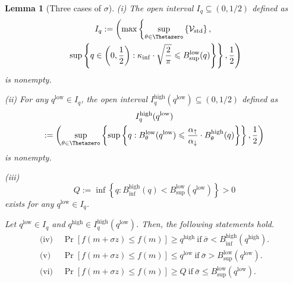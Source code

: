 \documentclass[journal]{IEEEtran}
\renewcommand{\geq}{\geqslant} %
\renewcommand{\leq}{\leqslant} %
\newtheorem{lemma}[theorem]{Lemma}
\theoremstyle{definition}
\newcommand{\aup}{\alpha_{\uparrow}}
\newcommand{\adown}{\alpha_{\downarrow}}
\begin{document}
\begin{lemma}[Three cases of $\sigma$]
(i) The open interval $I_q\subseteq (0, 1/2)$ defined as 
\begin{multline}
I_q := \left(
\max\left\{
\underset{\theta\in\Thetazero}{\sup}
\left\{\mathcal{V}_\mathrm{std}\right\}
,
\right.
\right.
\\
\left.
\left.
\sup\left\{
q\in\left(0, \frac12\right):
\kappa_{\inf}
\cdot
\sqrt{\frac{2}{\pi}} \leq 
B_{\sup}^\mathrm{low}(q) 
\right\}
\right\}
, \frac{1}{2} 
\right)
\label{eq:def_Iq}
\end{multline}
is nonempty.

(ii) For any $q^\mathrm{low}\in I_q$, the open interval $I_q^{\mathrm{high}}(q^\mathrm{low}) \subseteq (0, 1/2)$ defined as
\begin{multline}
I_q^{\mathrm{high}}(q^\mathrm{low})
\\
:=
\left(
\underset{\theta\in\Thetazero}{\sup}
\left\{
\sup
\left\{
q :
B_\theta^\mathrm{low}(q^\mathrm{low}) 
\leq \frac{\aup}{\adown}\cdot B_\theta^\mathrm{high}(q)
\right\}
\right\}, \frac12 \right)
\label{eq:def_qhigh}
\end{multline}
is nonempty.

(iii)
\begin{equation}
Q := 
\inf \left\{ q : 
B_{\inf}^\mathrm{high}(q)
< 
B_{\sup}^\mathrm{low}(q^\mathrm{low})
\right\}
>0
\label{eq:def_Q}
\end{equation}
exists
for any $q^\mathrm{low}\in I_q$.

Let $q^\mathrm{low} \in I_q$ and $q^\mathrm{high} \in I_q^\mathrm{high}(q^\mathrm{low})$. Then, the following statements hold.
%
\begin{align}
  \text{(iv) }
  &\Pr\left[f(m + \sigma z) \leq f(m) \right] \geq q^\mathrm{high} 
  \ \text{if}\ \bar\sigma < B_{\inf}^\mathrm{high}(q^\mathrm{high}). \label{eq:lemma:toosmall}  
  \\
  \text{(v) }
  &\Pr\left[f(m + \sigma z) \leq f(m) \right] \leq q^\mathrm{low} 
  \ \text{if}\  \bar\sigma > B_{\sup}^\mathrm{low}(q^\mathrm{low}). \label{eq:lemma:toolarge}
  \\
  \text{(vi) }
  &\Pr\left[f(m + \sigma z) \leq f(m) \right] \geq Q 
  \ \text{if}\ \bar\sigma \leq B_{\sup}^\mathrm{low}(q^\mathrm{low}). \label{eq:lemma:reasonable}
\end{align}


\end{lemma}
\end{document}

